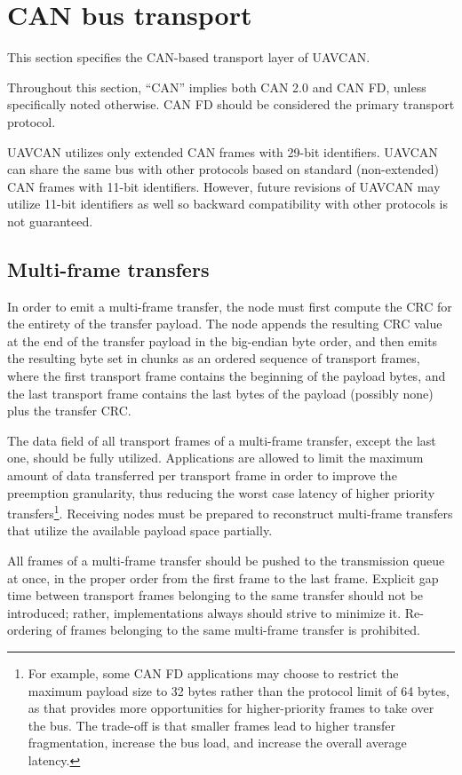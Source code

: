 \section{CAN bus transport}

This section specifies the CAN-based transport layer of UAVCAN.

Throughout this section, ``CAN'' implies both CAN 2.0 and CAN FD, unless specifically noted otherwise.
CAN FD should be considered the primary transport protocol.

UAVCAN utilizes only extended CAN frames with 29-bit identifiers.
UAVCAN can share the same bus with other protocols based on standard (non-extended) CAN frames with 11-bit identifiers.
However, future revisions of UAVCAN may utilize 11-bit identifiers as well so backward compatibility
with other protocols is not guaranteed.

\subsection{Multi-frame transfers}\label{sec:transport_multi_frame_transfers}

In order to emit a multi-frame transfer, the node must first compute the CRC for the entirety of the transfer payload.
The node appends the resulting CRC value at the end of the transfer payload in the big-endian byte order,
and then emits the resulting byte set in chunks as an ordered sequence of transport frames,
where the first transport frame contains the beginning of the payload bytes,
and the last transport frame contains the last bytes of the payload (possibly none) plus the transfer CRC.

The data field of all transport frames of a multi-frame transfer, except the last one, should be fully utilized.
Applications are allowed to limit the maximum amount of data transferred per transport frame in order to
improve the preemption granularity, thus reducing the worst case latency of higher priority
transfers\footnote{For example, some CAN FD applications may choose to restrict the maximum payload size to 32 bytes
rather than the protocol limit of 64 bytes, as that provides more opportunities for higher-priority frames to
take over the bus. The trade-off is that smaller frames lead to higher transfer fragmentation, increase the bus load,
and increase the overall average latency.}.
Receiving nodes must be prepared to reconstruct multi-frame transfers that utilize the
available payload space partially.

All frames of a multi-frame transfer should be pushed to the transmission queue at once,
in the proper order from the first frame to the last frame.
Explicit gap time between transport frames belonging to the same transfer should not be introduced;
rather, implementations always should strive to minimize it.
Re-ordering of frames belonging to the same multi-frame transfer is prohibited.

